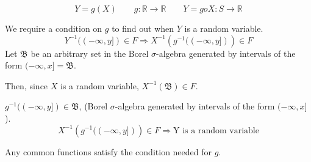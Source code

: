 \documentclass{article}
\begin{document}
$$ Y=g(X) \qquad g:\mathbb{R} \to \mathbb{R} \qquad Y= goX:S\to \mathbb{R}$$

We require a condition on $g$ to find out when $Y$ is a random variable.
$$ Y^{-1}((-\infty ,y]) \in F \Rightarrow X^{-1} \left( g^{-1} ((-\infty,y])\right) \in F$$
Let $\mathfrak{B}$ be an arbitrary set in the Borel $\sigma$-algebra generated by intervals of the form $(-\infty,x] = \mathfrak{B}$.

Then, since $X$ is a random variable, $X^{-1}(\mathfrak{B}) \in F$.

$ g^{-1} ((-\infty,y]) \in \mathfrak{B}$, (Borel $\sigma$-algebra generated by intervals of the form $(-\infty,x] $).
$$X^{-1} \left( g^{-1} ((-\infty,y])\right) \in F \Rightarrow \text{Y is a random variable} $$

Any common functions satisfy the condition needed for $g$.
\end{document}
